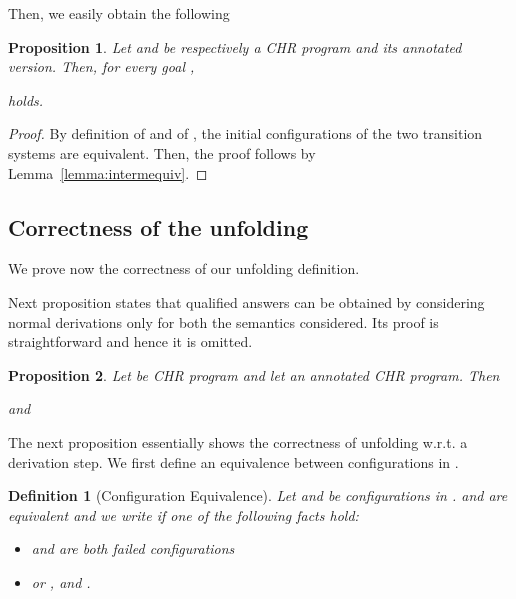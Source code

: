 \documentclass{tlp}
\newtheorem{definition}{Definition} \newtheorem{proposition}{Proposition} \newtheorem{example}{Example} \newtheorem{corollary}{Corollary} \newtheorem{theorem}{Theorem} \newtheorem{lemma}{Lemma}
\begin{document}
\noindent Then, we easily obtain the following \\

\setcounter{proposition}{0}
\begin{proposition}
Let  and  be respectively a CHR program and its annotated version.
Then, for every goal ,

holds.
\end{proposition}
\setcounter{proposition}{4}
\begin{proof}
By definition of  and of ,
the initial configurations of the two transition systems are equivalent. Then, the proof follows by Lemma~\ref{lemma:intermequiv}.
\end{proof}


\subsection{Correctness of the unfolding}
We prove now the correctness of our unfolding definition.

Next proposition states that qualified answers can be obtained  by considering normal derivations only for both the semantics  considered. Its proof is straightforward and hence it is omitted.

\begin{proposition}\label{prop:solonorm}
Let  be CHR program  and let  an annotated CHR program.
Then

and

\end{proposition}


The next proposition essentially shows the correctness of unfolding w.r.t. a derivation step.
We first define an equivalence between configurations in .

\begin{definition}[{\sc Configuration Equivalence}]\label{def:SE}
Let   and   be configurations  in .
 and  are equivalent and we write  if one of the following facts hold:
\begin{itemize}
  \item  and  are both failed configurations
  \item or ,  and .
\end{itemize}

\end{definition}
\end{document}
